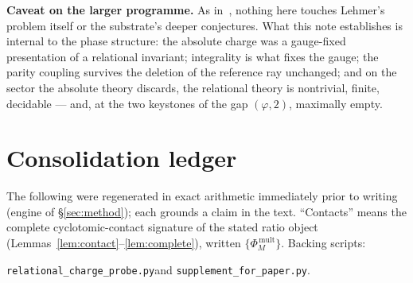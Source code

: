 \documentclass[11pt]{article}
\theoremstyle{plain}
\theoremstyle{definition}
\theoremstyle{remark}
\begin{document}
\medskip
\noindent\textbf{Caveat on the larger programme.} As in~\cite{CMC}, nothing here
touches Lehmer's problem itself or the substrate's deeper conjectures. What this
note establishes is internal to the phase structure: the absolute charge was a
gauge-fixed presentation of a relational invariant; integrality is what fixes
the gauge; the parity coupling survives the deletion of the reference ray
unchanged; and on the sector the absolute theory discards, the relational
theory is nontrivial, finite, decidable --- and, at the two keystones of the gap
$(\varphi,2)$, maximally empty.

\appendix

\section{Consolidation ledger}\label{app:ledger}

The following were regenerated in exact arithmetic immediately prior to writing
(engine of \S\ref{sec:method}); each grounds a claim in the text. ``Contacts''
means the complete cyclotomic-contact signature of the stated ratio object
(Lemmas~\ref{lem:contact}--\ref{lem:complete}), written
$\{\Phi_{M}^{\,\mathrm{mult}}\}$. Backing scripts:\\
\centerline{\texttt{relational\_charge\_probe.py}\quad and\quad
\texttt{supplement\_for\_paper.py}.}
\end{document}
